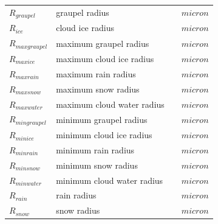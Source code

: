 \documentclass[letterpaper,titlepage,10pt]{article}
\numberwithin{equation}{section}
\begin{document}
\begin{appendices}
\begin{longtable}{p{}p{}p{}p{}}
	$R_{graupel}$      & graupel radius                                                                       &                            & $micron$ \\
	$R_{ice}$          & cloud ice radius                                                                     &                            & $micron$ \\
	$R_{maxgraupel}$   & maximum graupel radius                                                               &                            & $micron$ \\
	$R_{maxice}$       & maximum cloud ice radius                                                             &                            & $micron$ \\
	$R_{maxrain}$      & maximum rain radius                                                                  &                            & $micron$ \\
	$R_{maxsnow}$      & maximum snow radius                                                                  &                            & $micron$ \\
	$R_{maxwater}$     & maximum cloud water radius                                                           &                            & $micron$ \\
	$R_{mingraupel}$   & minimum graupel radius                                                               &                            & $micron$ \\
	$R_{minice}$       & minimum cloud ice radius                                                             &                            & $micron$ \\
	$R_{minrain}$      & minimum rain radius                                                                  &                            & $micron$ \\
	$R_{minsnow}$      & minimum snow radius                                                                  &                            & $micron$ \\
	$R_{minwater}$     & minimum cloud water radius                                                           &                            & $micron$ \\
	$R_{rain}$         & rain radius                                                                          &                            & $micron$ \\
	$R_{snow}$         & snow radius                                                                          &                            & $micron$ \\

\end{longtable}
\end{appendices}
\end{document}
